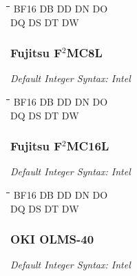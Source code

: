 {\tt\begin{tabbing} 
\hspace{3cm}\=\hspace{3cm}\=\hspace{3cm}\=\hspace{3cm}\=\kill
BF16       \> DB          \> DD          \> DN          \> DO \\
DQ         \> DS          \> DT          \> DW \\
\end{tabbing}}

\subsubsection{Fujitsu F$^{2}$MC8L}

{\em Default Integer Syntax: Intel}

{\tt\begin{tabbing} 
\hspace{3cm}\=\hspace{3cm}\=\hspace{3cm}\=\hspace{3cm}\=\kill
BF16       \> DB          \> DD          \> DN          \> DO \\
DQ         \> DS          \> DT          \> DW \\
\end{tabbing}}

\subsubsection{Fujitsu F$^{2}$MC16L}

{\em Default Integer Syntax: Intel}

{\tt\begin{tabbing} 
\hspace{3cm}\=\hspace{3cm}\=\hspace{3cm}\=\hspace{3cm}\=\kill
BF16       \> DB          \> DD          \> DN          \> DO \\
DQ         \> DS          \> DT          \> DW \\
\end{tabbing}}

\subsubsection{OKI OLMS-40}

{\em Default Integer Syntax: Intel}

